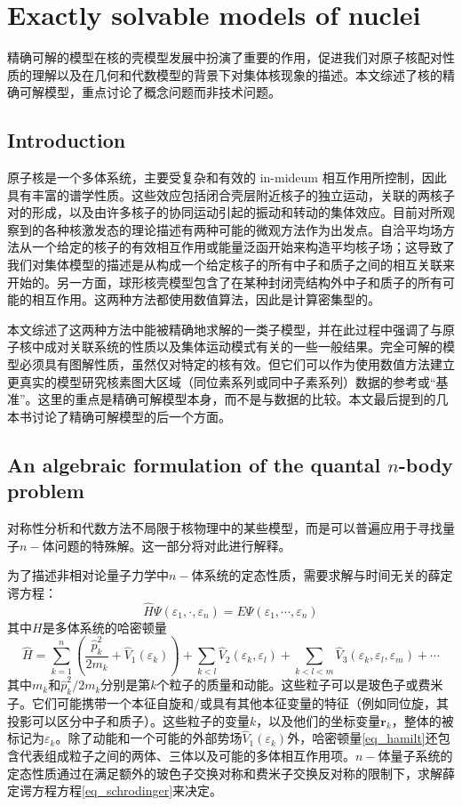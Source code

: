 \chapter{Exactly solvable models of nuclei}
精确可解的模型在核的壳模型发展中扮演了重要的作用，促进我们对原子核配对性质的理解以及在几何和代数模型的背景下对集体核现象的描述。本文综述了核的精确可解模型，重点讨论了概念问题而非技术问题。
\section{Introduction}
原子核是一个多体系统，主要受复杂和有效的 in-mideum 相互作用所控制，因此具有丰富的谱学性质。这些效应包括闭合壳层附近核子的独立运动，关联的两核子对的形成，以及由许多核子的协同运动引起的振动和转动的集体效应。目前对所观察到的各种核激发态的理论描述有两种可能的微观方法作为出发点。自洽平均场方法从一个给定的核子的有效相互作用或能量泛函开始来构造平均核子场；这导致了我们对集体模型的描述是从构成一个给定核子的所有中子和质子之间的相互关联来开始的。另一方面，球形核壳模型包含了在某种封闭壳结构外中子和质子的所有可能的相互作用。这两种方法都使用数值算法，因此是计算密集型的。

本文综述了这两种方法中能被精确地求解的一类子模型，并在此过程中强调了与原子核中成对关联系统的性质以及集体运动模式有关的一些一般结果。完全可解的模型必须具有图解性质，虽然仅对特定的核有效。但它们可以作为使用数值方法建立更真实的模型研究核素图大区域（同位素系列或同中子素系列）数据的参考或“基准”。这里的重点是精确可解模型本身，而不是与数据的比较。本文最后提到的几本书讨论了精确可解模型的后一个方面。

\section{An algebraic formulation of the quantal $n$-body problem}
对称性分析和代数方法不局限于核物理中的某些模型，而是可以普遍应用于寻找量子$n-$体问题的特殊解。这一部分将对此进行解释。

为了描述非相对论量子力学中$n-$体系统的定态性质，需要求解与时间无关的薛定谔方程：
\begin{equation}\label{eq_schrodinger}
\hat{H}\Psi(\varepsilon_1,\cdot,\varepsilon_n)=E\Psi(\varepsilon_1,\cdots,\varepsilon_n)
\end{equation}
其中$H$是多体系统的哈密顿量
\begin{equation}\label{eq_hamilt}
\hat{H}=\sum_{k=1}^n\left(\frac{\hat{p}^2_k}{2m_k}+\hat{V}_1(\varepsilon_k)\right)+\sum_{k<l}\hat{V}_2(\varepsilon_k,\varepsilon_l)+\sum_{k<l<m}\hat{V}_3(\varepsilon_k,\varepsilon_l,\varepsilon_m)+\cdots
\end{equation}
其中$m_k$和$\hat{p}_k^2/2m_k$分别是第$k$个粒子的质量和动能。这些粒子可以是玻色子或费米子。它们可能携带一个本征自旋和/或具有其他本征变量的特征（例如同位旋，其投影可以区分中子和质子）。这些粒子的变量$k$，以及他们的坐标变量$\bm{r}_k$，整体的被标记为$\varepsilon_k$。除了动能和一个可能的外部势场$\hat{V}_1(\varepsilon_k)$外，哈密顿量\ref{eq_hamilt}还包含代表组成粒子之间的两体、三体以及可能的多体相互作用项。$n-$体量子系统的定态性质通过在满足额外的玻色子交换对称和费米子交换反对称的限制下，求解薛定谔方程方程\ref{eq_schrodinger}来决定。

